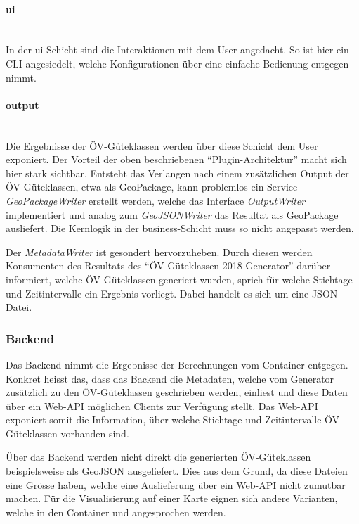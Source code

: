 \paragraph{ui}~\\
\label{layer:ui}
In der ui-Schicht sind die Interaktionen mit dem User angedacht.
So ist hier ein \ac{CLI} angesiedelt, welche Konfigurationen über eine einfache Bedienung entgegen nimmt.

\paragraph{output}~\\
\label{layer:output}
Die Ergebnisse der \acs{ÖV}-Güteklassen werden über diese Schicht dem User exponiert.
Der Vorteil der oben beschriebenen "`Plugin-Architektur"' macht sich hier stark sichtbar.
Entsteht das Verlangen nach einem zusätzlichen Output der \acs{ÖV}-Güteklassen, etwa als GeoPackage, kann problemlos ein Service \emph{GeoPackageWriter} erstellt werden, welche das Interface \emph{OutputWriter} implementiert und analog zum \emph{GeoJSONWriter} das Resultat als GeoPackage ausliefert.
Die Kernlogik in der business-Schicht muss so nicht angepasst werden.

Der \emph{MetadataWriter} ist gesondert hervorzuheben.
Durch diesen werden Konsumenten des Resultats des "`\acs{ÖV}-Güteklassen 2018 Generator"' darüber informiert, welche \acs{ÖV}-Güteklassen generiert wurden, sprich für welche Stichtage und Zeitintervalle ein Ergebnis vorliegt.
Dabei handelt es sich um eine JSON-Datei.

\subsubsection{Backend}
\label{container:Backend}

Das Backend nimmt die Ergebnisse der Berechnungen vom Container  entgegen.
Konkret heisst das, dass das Backend die Metadaten, welche vom Generator zusätzlich zu den \acs{ÖV}-Güteklassen geschrieben werden, einliest und diese Daten über ein Web-\acs{API} möglichen Clients zur Verfügung stellt.
Das Web-\acs{API} exponiert somit die Information, über welche Stichtage und Zeitintervalle \acs{ÖV}-Güteklassen vorhanden sind.

Über das Backend werden nicht direkt die generierten \acs{ÖV}-Güteklassen beispielsweise als GeoJSON ausgeliefert.
Dies aus dem Grund, da diese Dateien eine Grösse haben, welche eine Auslieferung über ein Web-\ac{API} nicht zumutbar machen.
Für die Visualisierung auf einer Karte eignen sich andere Varianten, welche in den Container  und  angesprochen werden.

